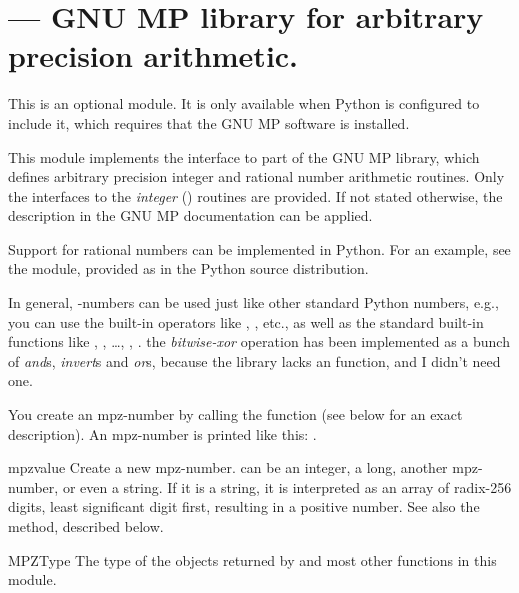 \section{ ---
         GNU MP library for arbitrary precision arithmetic.}



This is an optional module.  It is only available when Python is
configured to include it, which requires that the GNU MP software is
installed.

This module implements the interface to part of the GNU MP library,
which defines arbitrary precision integer and rational number
arithmetic routines.  Only the interfaces to the \emph{integer}
() routines are provided. If not stated
otherwise, the description in the GNU MP documentation can be applied.

Support for rational numbers can be
implemented in Python.  For an example, see the %
 module, provided as
 in the Python source distribution.

In general, -numbers can be used just like other standard
Python numbers, e.g., you can use the built-in operators like \code{+},
\code{*}, etc., as well as the standard built-in functions like
, , \ldots, ,
.   the \emph{bitwise-xor}
operation has been implemented as a bunch of \emph{and}s,
\emph{invert}s and \emph{or}s, because the library lacks an
 function, and I didn't need one.

You create an mpz-number by calling the function  (see
below for an exact description). An mpz-number is printed like this:
.


\begin{funcdesc}{mpz}{value}
  Create a new mpz-number.  can be an integer, a long,
  another mpz-number, or even a string. If it is a string, it is
  interpreted as an array of radix-256 digits, least significant digit
  first, resulting in a positive number. See also the 
  method, described below.
\end{funcdesc}

\begin{datadesc}{MPZType}
  The type of the objects returned by  and most other
  functions in this module.
\end{datadesc}


